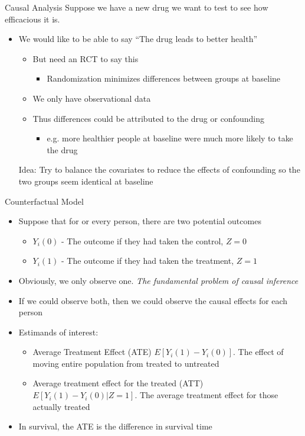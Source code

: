 \begin{frame}{Causal Analysis}
Suppose we have a new drug we want to test to see how efficacious it is.
 \begin{itemize}
  \item We would like to be able to say ``The drug leads to better health''
  \begin{itemize}
   \item But need an RCT to say this
   \begin{itemize}
    \item Randomization minimizes differences between groups at baseline
   \end{itemize}

   \item We only have observational data
   \item Thus differences could be attributed to the drug or confounding
   
   \begin{itemize}
    \item e.g. more healthier people at baseline were much more likely to take the drug
   \end{itemize}

  \end{itemize}
Idea: Try to balance the covariates to reduce the effects of confounding
so the two groups seem identical at baseline
 \end{itemize}

\end{frame}

\begin{frame}{Counterfactual Model}
\begin{itemize}
 \item Suppose that for or every person, there are two potential outcomes
 \begin{itemize}
  \item $Y_i(0)$ - The outcome if they had taken the control, $Z=0$
  \item $Y_i(1)$ - The outcome if they had taken the treatment, $Z=1$
 \end{itemize}
\item Obviously, we only observe one. \textit{The fundamental problem of causal inference}
\item If we could observe both, then we could observe the causal effects for each person
\item Estimands of interest:
\begin{itemize}
 \item Average Treatment Effect (ATE) $E[Y_i(1)-Y_i(0)]$. The effect of moving entire population
 from treated to untreated
 \item Average treatment effect for the treated (ATT) $E[Y_i(1)-Y_i(0)|Z=1]$. The average treatment
 effect for those actually treated
\end{itemize}
\item In survival, the ATE is the difference in survival time
\end{itemize}
 
\end{frame}

